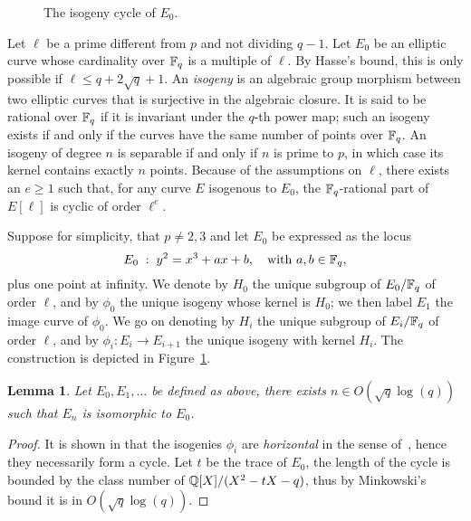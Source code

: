 \documentclass{sig-alternate}
\newtheorem{lemma}[definition]{Lemma}
\begin{document}
\begin{figure}
  \centering
  \caption{The isogeny cycle of $E_0$.}
  \label{fig:volcano}
\end{figure}

Let $\ell$ be a prime different from $p$ and not dividing $q-1$. Let
$E_0$ be an elliptic curve whose cardinality over $\mathbb{F}_q$ is a multiple
of $\ell$. By Hasse's bound, this is only possible if $\ell\le q +
2\sqrt{q} + 1$.  An \emph{isogeny} is an algebraic group morphism
between two elliptic curves that is surjective in the algebraic
closure. It is said to be rational over $\mathbb{F}_q$ if it is invariant
under the $q$-th power map; such an isogeny exists if and only if the
curves have the same number of points over $\mathbb{F}_q$. An isogeny of
degree $n$ is separable if and only if $n$ is prime to $p$, in which
case its kernel contains exactly $n$ points.  Because of the
assumptions on $\ell$, there exists an $e\ge1$ such that, for any
curve $E$ isogenous to $E_0$, the $\mathbb{F}_q$-rational part of $E[\ell]$ is
cyclic of order $\ell^e$.

Suppose for simplicity, that $p\ne2,3$ and let $E_0$ be expressed as
the locus
\begin{equation}
  E_0 \;:\; y^2 = x^3 + ax + b,
  \quad\text{with $a,b\in\mathbb{F}_q$},
\end{equation}
plus one point at infinity.  We denote by $H_0$ the unique subgroup of
$E_0/\mathbb{F}_q$ of order $\ell$, and by $\phi_0$ the unique isogeny whose
kernel is $H_0$; we then label $E_1$ the image curve of $\phi_0$. We
go on denoting by $H_i$ the unique subgroup of $E_i/\mathbb{F}_q$ of order
$\ell$, and by $\phi_i:E_i\to E_{i+1}$ the unique isogeny with kernel
$H_i$. The construction is depicted in Figure~\ref{fig:volcano}.

\begin{lemma}
  \label{th:class-number}
  Let $E_0,E_1,\dots$ be defined as above, there exists $n\in
  O(\sqrt{q}\log (q))$ such that $E_n$ is isomorphic to $E_0$.
\end{lemma}
\begin{proof}
  It is shown in \cite[\S~4]{couveignes+lercier11} that the
  isogenies $\phi_i$ are \emph{horizontal} in the sense
  of~\cite{kohel}, hence they necessarily form a cycle. Let $t$ be the
  trace of $E_0$, the length of the cycle is bounded by the class
  number of $\mathbb{Q}[X]/(X^2-tX-q)$, thus by Minkowski's bound it is in
  $O(\sqrt{q}\log (q))$.
\end{proof}
\end{document}
